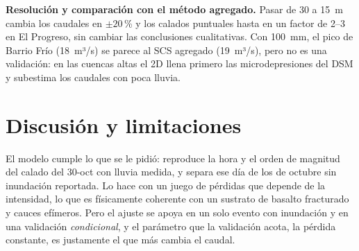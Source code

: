 \documentclass{sosg-informe}
\begin{document}
\textbf{Resolución y comparación con el método agregado.} Pasar de 30 a 15~m cambia los caudales en ${\pm}20$\,\% y los calados puntuales hasta en un factor de 2--3 en El Progreso, sin cambiar las conclusiones cualitativas. Con 100~mm, el pico de Barrio Frío (18~m³/s) se parece al SCS agregado (19~m³/s), pero no es una validación: en las cuencas altas el 2D llena primero las microdepresiones del DSM y subestima los caudales con poca lluvia.

\section{Discusión y limitaciones}

El modelo cumple lo que se le pidió: reproduce la hora y el orden de magnitud del calado del 30-oct con lluvia medida, y separa ese día de los de octubre sin inundación reportada. Lo hace con un juego de pérdidas que depende de la intensidad, lo que es físicamente coherente con un sustrato de basalto fracturado y cauces efímeros. Pero el ajuste se apoya en un solo evento con inundación y en una validación \emph{condicional}, y el parámetro que la validación acota, la pérdida constante, es justamente el que más cambia el caudal.
\end{document}
